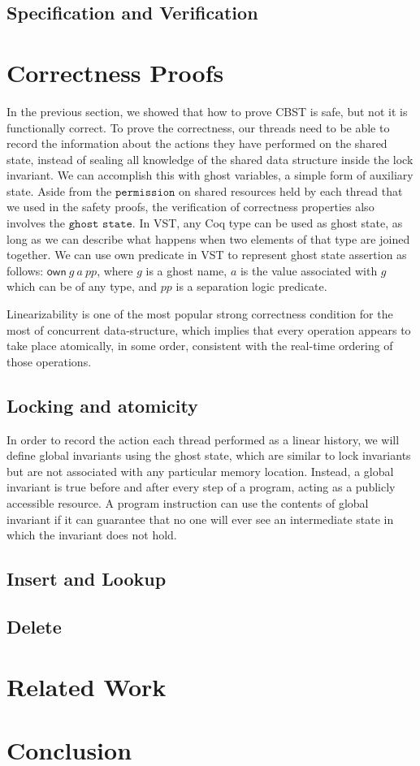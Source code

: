 \documentclass[11pt]{article} %
\begin{document}
\subsection{Specification and Verification}
\section{Correctness Proofs}
In the previous section, we showed that how to prove CBST is safe, but not it is functionally correct. To prove the correctness, our threads need to be able to record the information about the actions they have performed on the shared state, instead of sealing all knowledge of the shared data structure inside the lock invariant. We can accomplish this with ghost variables, a simple form of auxiliary state. Aside from the $\texttt{permission}$ on shared resources held by each thread that we used in the safety proofs, the verification of correctness properties also involves the $\texttt{ghost state}$. In VST, any Coq type can be used as ghost state, as long as we can describe what happens when two elements of that type are joined together. We can use own predicate in VST to represent ghost state assertion as follows: $\mathsf{own}\ g\ a\ \mathit{pp}$, where $g$ is a \textsf{ghost name}, $a$ is the value associated with $g$ which can be of any type, and $\mathit{pp}$ is a separation logic predicate. 


Linearizability is one of the most popular strong correctness condition for the most of concurrent data-structure, which implies that every operation appears to take place atomically, in some order, consistent with the real-time ordering of those operations. 

\subsection{Locking and atomicity} 
In order to record the action each thread performed as a linear history, we will define global invariants using the ghost state, which are similar to lock invariants but are not associated with any particular memory location. Instead, a global invariant is true before and after every step of a program, acting as a publicly accessible resource. A program instruction can use the contents of global invariant if it can guarantee that no one will ever see an intermediate state in which the invariant does not hold. 
\subsection{Insert and Lookup}

\subsection{Delete}

\section{Related Work}
\section{Conclusion}
\end{document}

